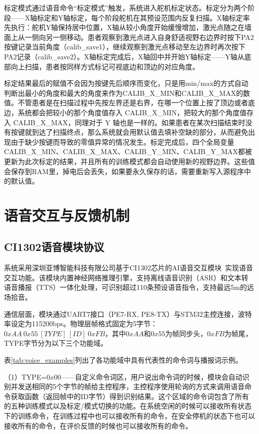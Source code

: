 标定模式通过语音命令“标定模式”触发，系统进入舵机标定状态。标定分为两个阶段——X轴标定和Y轴标定，每个阶段舵机在其预设范围内反复扫描。X轴标定率先执行：舵机Y轴保持居中位置，X轴从较小角度开始缓慢增加，激光点随之在墙面上从一侧向另一侧移动。患者观察到激光点进入自身舒适视野右边界时按下PA2按键记录当前角度（calib\_save1），继续观察到激光点移动至左边界时再次按下PA2记录（calib\_save2）。X轴标定完成后，X轴回中并开始Y轴标定——Y轴从底部向上扫描，患者按同样方式标记可视底边和顶边的对应角度。

标定结果最后的赋值不会因为按键先后顺序而变化，只是用min/max的方式自动判断出最小的角度和最大的角度来作为CALIB\_X\_MIN和CALIB\_X\_MAX的数值。不管患者是在扫描过程中先按左界还是右界，在哪一个位置上按了顶边或者底边，系统都会把较小的那个角度值存入 CALIB\_X\_MIN，把较大的那个角度值存入 CALIB\_X\_MAX，同理对于 Y 轴也是一样的。如果患者在某次扫描结束时没有按键就到达了扫描终点，那么系统就会用默认值去填补空缺的部分，从而避免出现由于缺少按键而导致的零值异常的情况发生。标定完成后，四个全局变量 CALIB\_X\_MIN、CALIB\_X\_MAX、CALIB\_Y\_MIN、CALIB\_Y\_MAX都被更新为此次标定的结果，并且所有的训练模式都会自动使用新的视野边界。这些值会保存到RAM里，掉电后会丢失，如果要永久保存的话，需要重新写入源程序中的默认值。

\section{语音交互与反馈机制}

\subsection{CI1302语音模块协议}

系统采用深圳亚博智能科技有限公司基于CI1302芯片的AI语音交互模块~\cite{ci1302_doc}实现语音交互功能。该模块内置神经网络推理引擎，支持离线语音识别（ASR）和文本转语音播报（TTS）一体化处理，可识别超过110条预设语音指令，支持最远5m的远场拾音。

通信层面，模块通过UART7接口（PE7-RX, PE8-TX）与STM32主控连接，波特率设定为115200bps\cite{ci1302_doc}。物理层帧格式固定为5字节：$0xAA\ 0x55\ [TYPE]\ [ID]\ 0xFB$，其中$0xAA$和$0x55$为帧同步头，$0xFB$为帧尾，TYPE字节分为以下三个功能域。

表\ref{tab:voice_examples}列出了各功能域中具有代表性的命令词与播报词示例。

（1）TYPE=$0x00$——自定义命令词区，用户说出命令词的时候，模块会自动识别并发送相同的5个字节的帧给主控程序，主控程序使用轮询的方式来调用语音命令获取函数（返回帧中的ID字节）得到识别结果。这个区域的命令词包含了所有的五种训练模式以及标定/模式切换的功能。在系统空闲的时候可以接收所有状态下的训练命令，在训练过程中也可以接收所有的命令，在安全停机的状态下也可以接收所有的命令，在评价反馈的时候也可以接收所有的命令。

